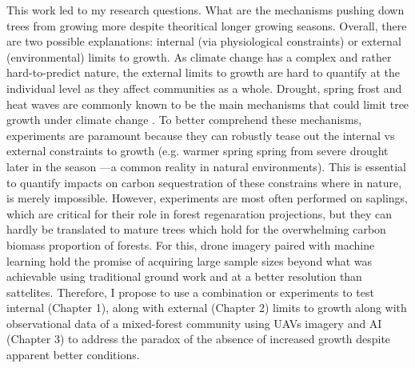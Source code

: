 \documentclass[12pt]{article}
\begin{document}
This work led to my research questions. What are the mechanisms pushing down trees from growing more despite theoritical longer growing seasons. Overall, there are two possible explanations: internal (via physiological constraints)\citep{zohner_effect_2023} or external (environmental) limits to growth. As climate change has a complex and rather hard-to-predict nature, the external limits to growth are hard to quantify at the individual level as they affect communities as a whole. Drought, spring frost and heat waves are commonly known to be the main mechanisms that could limit tree growth under climate change \citep{drobyshev_influence_2008}. To better comprehend these mechanisms, experiments are paramount because they can robustly tease out the internal vs external constraints to growth (e.g. warmer spring spring from severe drought later in the season ---a common reality in natural environments). This is essential to quantify impacts on carbon sequestration of these constrains where in nature, is merely impossible. However, experiments are most often performed on saplings, which are critical for their role in forest regenaration projections, but they can hardly be translated to mature trees which hold for the overwhelming carbon biomass proportion of forests. For this, drone imagery paired with machine learning hold the promise of acquiring large sample sizes beyond what was achievable using traditional ground work and at a better resolution than sattelites. Therefore, I propose to use a combination or experiments to test internal (Chapter 1), along with external (Chapter 2) limits to growth along with observational data of a mixed-forest community using UAVs imagery and AI (Chapter 3) to address the paradox of the absence of increased growth despite apparent better conditions.   \\

\end{document}
